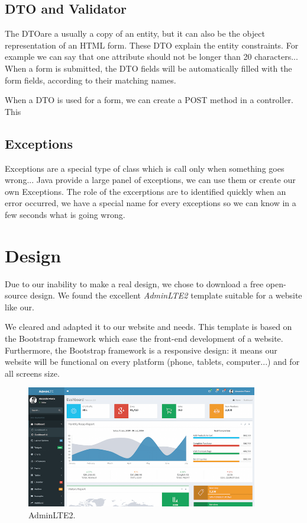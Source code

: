 \subsection{DTO and Validator}

The DTO\footnotemark are a usually a copy of an entity, but it can also be the object representation of an HTML form. These DTO explain the entity constraints. For example we can say that one attribute should not be longer than 20 characters... 
When a form is submitted, the DTO fields will be automatically filled with the form fields, according to their matching names. 
\linebreak

When a DTO is used for a form, we can create a POST method in a controller. This 




\subsection{Exceptions}

Exceptions are a special type of class which is call only when something goes wrong...
Java provide a large panel of exceptions, we can use them or create our own Exceptions.
The role of the excerptions are to identified quickly when an error occurred, we have a special name for every exceptions so we can know in a few seconds what is going wrong.


\section{Design}
Due to our inability to make a real design, we chose to download a free open-source design. We found the excellent \textit{AdminLTE2} template suitable for a website like our.
\newline

We cleared and adapted it to our website and needs.
This template is based on the Bootstrap framework which ease the front-end development of a website. Furthermore, the Bootstrap framework is a responsive design: it means our website will be functional on every platform (phone, tablets, computer...) and for all screens size.

\begin{figure}[!ht]
  \caption{AdminLTE2.}
  \centering
    \includegraphics[width=0.9\textwidth]{img/design.png}
\end{figure}





